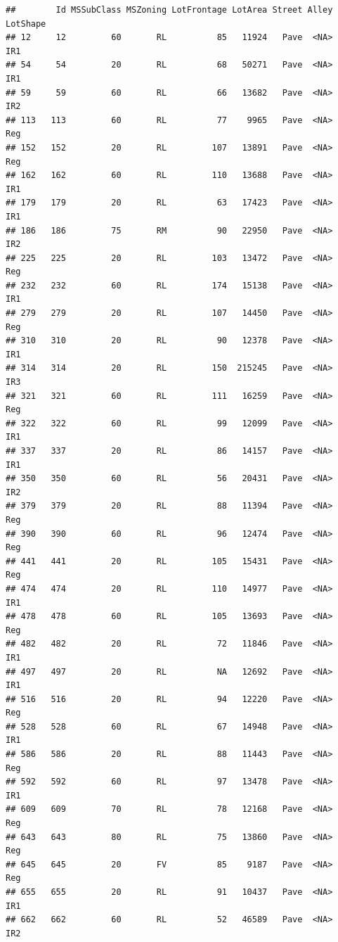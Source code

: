 \documentclass[]{article}
\begin{document}
\begin{verbatim}
##        Id MSSubClass MSZoning LotFrontage LotArea Street Alley LotShape
## 12     12         60       RL          85   11924   Pave  <NA>      IR1
## 54     54         20       RL          68   50271   Pave  <NA>      IR1
## 59     59         60       RL          66   13682   Pave  <NA>      IR2
## 113   113         60       RL          77    9965   Pave  <NA>      Reg
## 152   152         20       RL         107   13891   Pave  <NA>      Reg
## 162   162         60       RL         110   13688   Pave  <NA>      IR1
## 179   179         20       RL          63   17423   Pave  <NA>      IR1
## 186   186         75       RM          90   22950   Pave  <NA>      IR2
## 225   225         20       RL         103   13472   Pave  <NA>      Reg
## 232   232         60       RL         174   15138   Pave  <NA>      IR1
## 279   279         20       RL         107   14450   Pave  <NA>      Reg
## 310   310         20       RL          90   12378   Pave  <NA>      IR1
## 314   314         20       RL         150  215245   Pave  <NA>      IR3
## 321   321         60       RL         111   16259   Pave  <NA>      Reg
## 322   322         60       RL          99   12099   Pave  <NA>      IR1
## 337   337         20       RL          86   14157   Pave  <NA>      IR1
## 350   350         60       RL          56   20431   Pave  <NA>      IR2
## 379   379         20       RL          88   11394   Pave  <NA>      Reg
## 390   390         60       RL          96   12474   Pave  <NA>      Reg
## 441   441         20       RL         105   15431   Pave  <NA>      Reg
## 474   474         20       RL         110   14977   Pave  <NA>      IR1
## 478   478         60       RL         105   13693   Pave  <NA>      Reg
## 482   482         20       RL          72   11846   Pave  <NA>      IR1
## 497   497         20       RL          NA   12692   Pave  <NA>      IR1
## 516   516         20       RL          94   12220   Pave  <NA>      Reg
## 528   528         60       RL          67   14948   Pave  <NA>      IR1
## 586   586         20       RL          88   11443   Pave  <NA>      Reg
## 592   592         60       RL          97   13478   Pave  <NA>      IR1
## 609   609         70       RL          78   12168   Pave  <NA>      Reg
## 643   643         80       RL          75   13860   Pave  <NA>      Reg
## 645   645         20       FV          85    9187   Pave  <NA>      Reg
## 655   655         20       RL          91   10437   Pave  <NA>      IR1
## 662   662         60       RL          52   46589   Pave  <NA>      IR2

\end{verbatim}
\end{document}
